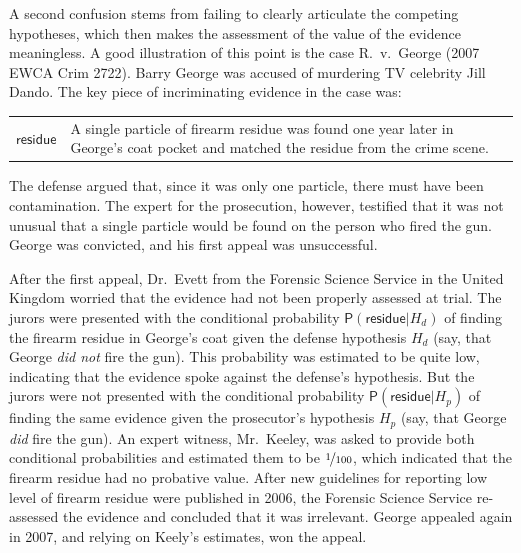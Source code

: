 \documentclass[
  letterpaper,
  DIV=11,
  numbers=noendperiod]{scrartcl}
\newcommand{\pr}[1]{\mathsf{P}(#1)}
\begin{document}
A second confusion stems from failing to clearly articulate the
competing hypotheses, which then makes the assessment of the value of
the evidence meaningless. A good illustration of this point is the case
R.~v.~George (2007 EWCA Crim 2722). Barry George was accused of
murdering TV celebrity Jill Dando. The key piece of incriminating
evidence in the case was:

\begin{center}
\begin{tabular}{lp{12cm}} 
    $\textsf{residue}$ &  
    A single particle of firearm  residue was found one year later in George's coat pocket and matched the residue from the crime scene. 
\end{tabular}
\end{center}

\noindent  The defense argued that, since it was only one particle,
there must have been contamination. The expert for the prosecution,
however, testified that it was not unusual that a single particle would
be found on the person who fired the gun. George was convicted, and his
first appeal was unsuccessful.

After the first appeal, Dr.~Evett from the Forensic Science Service in
the United Kingdom worried that the evidence had not been properly
assessed at trial. The jurors were presented with the conditional
probability \(\pr{\textsf{residue}\vert H_d}\) of finding the firearm
residue in George's coat given the defense hypothesis \(H_d\) (say, that
George \textit{did not} fire the gun). This probability was estimated to
be quite low, indicating that the evidence spoke against the defense's
hypothesis. But the jurors were not presented with the conditional
probability \(\pr{\textsf{residue}\vert H_p}\) of finding the same
evidence given the prosecutor's hypothesis \(H_p\) (say, that George
\textit{did} fire the gun). An expert witness, Mr.~Keeley, was asked to
provide both conditional probabilities and estimated them to be
\(\nicefrac{1}{100}\), which indicated that the firearm residue had no
probative value. After new guidelines for reporting low level of firearm
residue were published in 2006, the Forensic Science Service re-assessed
the evidence and concluded that it was irrelevant. George appealed again
in 2007, and relying on Keely's estimates, won the appeal.
\end{document}
